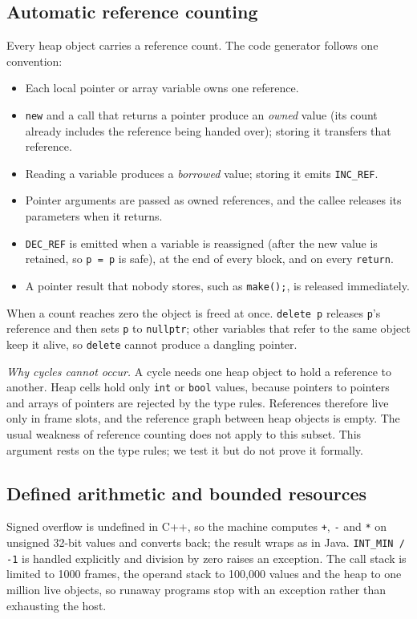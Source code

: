 \documentclass[conference]{IEEEtran}
\begin{document}
\subsection{Automatic reference counting}
\label{sec:arc}
Every heap object carries a reference count. The code generator follows one convention:
\begin{itemize}
\item Each local pointer or array variable owns one reference.
\item \texttt{new} and a call that returns a pointer produce an \emph{owned} value (its count already includes the
      reference being handed over); storing it transfers that reference.
\item Reading a variable produces a \emph{borrowed} value; storing it emits \texttt{INC\_REF}.
\item Pointer arguments are passed as owned references, and the callee releases its parameters when it returns.
\item \texttt{DEC\_REF} is emitted when a variable is reassigned (after the new value is retained, so
      \texttt{p = p} is safe), at the end of every block, and on every \texttt{return}.
\item A pointer result that nobody stores, such as \texttt{make();}, is released immediately.
\end{itemize}
When a count reaches zero the object is freed at once. \texttt{delete p} releases \texttt{p}'s reference and then
sets \texttt{p} to \texttt{nullptr}; other variables that refer to the same object keep it alive, so \texttt{delete}
cannot produce a dangling pointer.

\emph{Why cycles cannot occur.} A cycle needs one heap object to hold a reference to another. Heap cells hold only
\texttt{int} or \texttt{bool} values, because pointers to pointers and arrays of pointers are rejected by the
type rules. References therefore live only in frame slots, and the reference graph between heap objects is empty.
The usual weakness of reference counting does not apply to this subset. This argument rests on the type rules; we
test it but do not prove it formally.

\subsection{Defined arithmetic and bounded resources}
Signed overflow is undefined in C++, so the machine computes \texttt{+}, \texttt{-} and \texttt{*} on unsigned
32-bit values and converts back; the result wraps as in Java. \texttt{INT\_MIN / -1} is handled explicitly and
division by zero raises an exception. The call stack is limited to 1000 frames, the operand stack to 100{,}000
values and the heap to one million live objects, so runaway programs stop with an exception rather than
exhausting the host.
\end{document}
